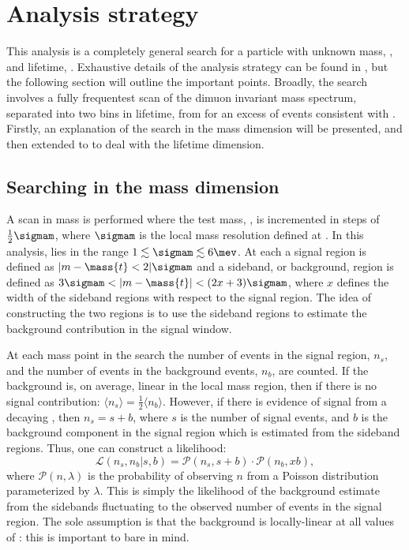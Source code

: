 \section{Analysis strategy}
\label{sec:db:strategy}

This analysis is a completely general search for a particle with unknown mass, \mass\db, and
lifetime, \lifetime\db.
Exhaustive details of the analysis strategy can be found in , but the
following section will outline the important points.
Broadly, the search involves a fully frequentest scan of the dimuon invariant mass spectrum,
separated into two bins in lifetime, from
\btokstrmumu for an excess of events consistent with \dbtomumu.
Firstly, an explanation of the search in the mass dimension will be presented, and then extended to
to deal with the lifetime dimension.


\subsection{Searching in the mass dimension}
A scan in mass is performed where the test mass, , is incremented in steps of
$\tfrac12\sigmam$, where $\sigmam$ is the local mass resolution defined at .
In this analysis, \sigmam lies in the range $1\lesssim\sigmam\lesssim6\mev$.
At each  a signal region is defined as $|m-\mass{t}<2|\sigmam$ and a sideband, or
background, region is defined as $3\sigmam<|m-\mass{t}|<(2x+3)\sigmam$, where
$x$ defines the width of the sideband regions with respect to the signal region.
The idea of constructing the two regions is to use the sideband regions to estimate the background
contribution in the signal window.

At each mass point in the search the number of events in the signal region, $n_s$, and the number
of events in the background events, $n_b$, are counted.
If the background is, on average, linear in the local mass region, then if there is no signal
contribution: $\langle n_s\rangle=\tfrac12\langle n_b\rangle$.
However, if there is evidence of signal from a decaying \db, then $n_s=s+b$, where $s$ is the
number of signal events, and $b$ is the background component in the signal region which is
estimated from the sideband regions.
Thus, one can construct a likelihood:
\begin{equation}
  \mathcal{L}(n_s, n_b | s, b) =
  \mathcal{P}(n_s, s+b) \cdot
  \mathcal{P}(n_b, xb),
  \label{eq:db:like1}
\end{equation}
where $\mathcal{P}(n, \lambda)$ is the probability of observing $n$ from a Poisson distribution
parameterized by $\lambda$.
This is simply the likelihood of the background estimate from the sidebands fluctuating to
the observed number of events in the signal region.
The sole assumption is that the background is locally-linear at all values of : this is
important to bare in mind.

